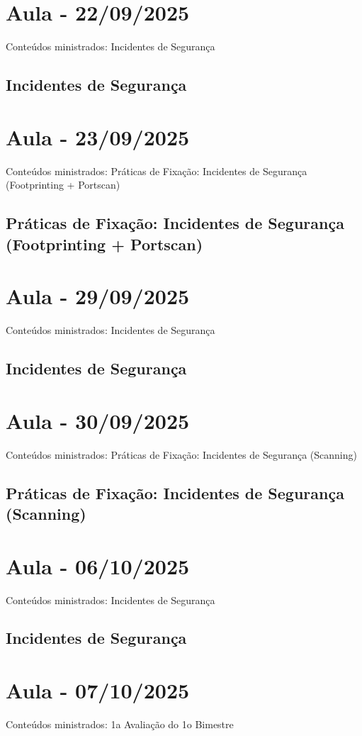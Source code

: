 \documentclass{article}
\begin{document}
\section{Aula - 22/09/2025}
Conteúdos ministrados: Incidentes de Segurança
\subsection{Incidentes de Segurança}

\section{Aula - 23/09/2025}
Conteúdos ministrados: Práticas de Fixação: Incidentes de Segurança (Footprinting + Portscan)
\subsection{Práticas de Fixação: Incidentes de Segurança (Footprinting + Portscan)}

\section{Aula - 29/09/2025}
Conteúdos ministrados: Incidentes de Segurança
\subsection{Incidentes de Segurança}

\section{Aula - 30/09/2025}
Conteúdos ministrados: Práticas de Fixação: Incidentes de Segurança (Scanning)
\subsection{Práticas de Fixação: Incidentes de Segurança (Scanning)}

\section{Aula - 06/10/2025}
Conteúdos ministrados: Incidentes de Segurança
\subsection{Incidentes de Segurança}

\section{Aula - 07/10/2025}
Conteúdos ministrados: 1a Avaliação do 1o Bimestre
\end{document}
